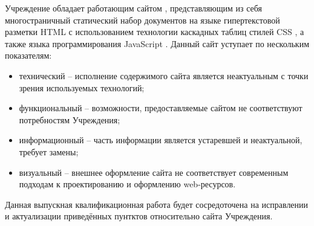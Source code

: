 Учреждение обладает работающим сайтом \cite{meson-uc}, представляющим из себя многостраничный статический набор документов на языке гипертекстовой разметки HTML \cite{wiki-html} с использованием технологии каскадных таблиц стилей CSS \cite{wiki-css}, а также языка программирования JavaScript \cite{wiki-js}.
Данный сайт уступает по нескольким показателям:
\begin{itemize}
    \item технический -- исполнение содержимого сайта является неактуальным с точки зрения используемых технологий;
    \item функциональный -- возможности, предоставляемые сайтом не соответствуют потребностям Учреждения;
    \item информационный -- часть информации является устаревшей и неактуальной, требует замены;
    \item визуальный -- внешнее оформление сайта не соответствует современным подходам к проектированию и оформлению web-ресурсов.
\end{itemize}

Данная выпускная квалификационная работа будет сосредоточена на исправлении и актуализации приведённых пунтктов относительно сайта Учреждения.

\clearpage
